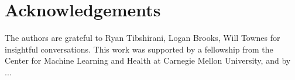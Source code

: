 \section{Acknowledgements}
The authors are grateful to Ryan Tibshirani, Logan Brooks, Will Townes for insightful conversations. 
This work was supported by a fellowship from the Center for Machine Learning and Health at Carnegie Mellon University, and by ...


